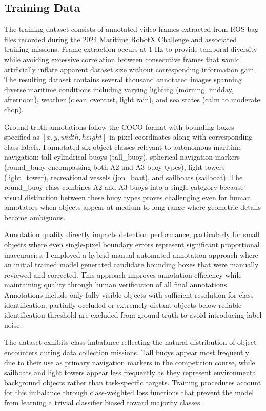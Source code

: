 \subsection{Training Data} \label{sec:yolo_training data}

The training dataset consists of annotated video frames extracted from ROS bag files recorded during the 2024 Maritime RobotX Challenge and associated training missions.
Frame extraction occurs at 1 Hz to provide temporal diversity while avoiding excessive correlation between consecutive frames that would artificially inflate apparent dataset size without corresponding information gain.
The resulting dataset contains several thousand annotated images spanning diverse maritime conditions including varying lighting (morning, midday, afternoon), weather (clear, overcast, light rain), and sea states (calm to moderate chop).

Ground truth annotations follow the COCO format with bounding boxes specified as $[x, y, width, height]$ in pixel coordinates along with corresponding class labels.
I annotated six object classes relevant to autonomous maritime navigation: tall cylindrical buoys (tall\_buoy), spherical navigation markers (round\_buoy encompassing both A2 and A3 buoy types), light towers (light\_tower), recreational vessels (jon\_boat), and sailboats (sailboat).
The round\_buoy class combines A2 and A3 buoys into a single category because visual distinction between these buoy types proves challenging even for human annotators when objects appear at medium to long range where geometric details become ambiguous.

Annotation quality directly impacts detection performance, particularly for small objects where even single-pixel boundary errors represent significant proportional inaccuracies.
I employed a hybrid manual-automated annotation approach where an initial trained model generated candidate bounding boxes that were manually reviewed and corrected.
This approach improves annotation efficiency while maintaining quality through human verification of all final annotations.
Annotations include only fully visible objects with sufficient resolution for class identification; partially occluded or extremely distant objects below reliable identification threshold are excluded from ground truth to avoid introducing label noise.

The dataset exhibits class imbalance reflecting the natural distribution of object encounters during data collection missions.
Tall buoys appear most frequently due to their use as primary navigation markers in the competition course, while sailboats and light towers appear less frequently as they represent environmental background objects rather than task-specific targets.
Training procedures account for this imbalance through class-weighted loss functions that prevent the model from learning a trivial classifier biased toward majority classes.

